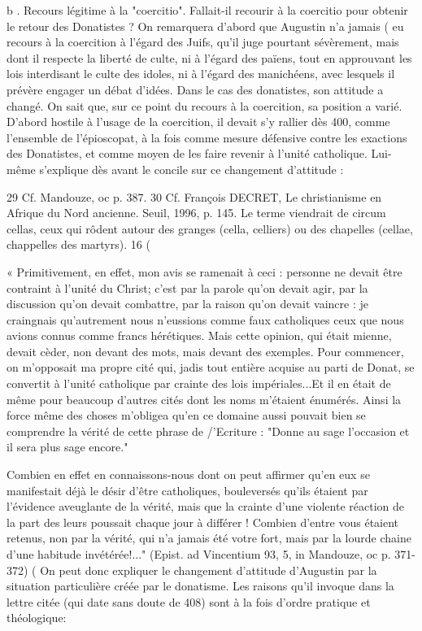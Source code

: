b . Recours légitime	à  la "coercitio".	Fallait-il recourir à la coercitio
pour obtenir le retour des Donatistes ? On remarquera d'abord que Augustin n'a jamais	(
eu recours à la coercition à l'égard des Juifs, qu'il juge pourtant sévèrement, mais
dont il respecte la liberté de culte, ni à l'égard des païens, tout en approuvant les lois interdisant le culte des idoles, ni à l'égard des manichéens, avec lesquels il prévère engager un débat d'idées. Dans le cas des donatistes, son attitude a changé. On sait que, sur ce point du recours à la coercition, sa position a varié. D'abord hostile à l'usage de la coercition, il devait s'y rallier dès 400, comme l'ensemble de l'épioscopat, à la fois comme mesure défensive contre les exactions des Donatistes, et comme moyen de les faire revenir à l'unité catholique. Lui-même s'explique dès avant le concile sur ce changement d'attitude :



29 Cf. Mandouze, oc p. 387.
30 Cf. François DECRET, Le christianisme en Afrique du Nord ancienne. Seuil, 1996, p. 145. Le terme viendrait de circum cellas, ceux qui rôdent autour des granges (cella, celliers) ou des chapelles (cellae, chappelles des martyrs).
16
(
 
« Primitivement, en effet, mon avis se ramenait à ceci : personne ne devait être contraint à l'unité du Christ; c'est par la parole qu'on devait agir, par la discussion qu'on devait combattre, par la raison qu'on devait vaincre : je craingnais qu'autrement nous n'eussions comme faux catholiques ceux que nous avions connus comme francs hérétiques. Mais cette opinion, qui était mienne, devait cèder, non devant des mots, mais devant des exemples. Pour commencer, on m'opposait ma propre cité qui, jadis tout entière acquise au parti de Donat, se convertit à l'unité
catholique par crainte des lois impériales...Et il en était de même pour beaucoup d'autres cités dont les noms m'étaient énumérés. Ainsi la force même des choses m'obligea qu'en ce domaine aussi pouvait bien se comprendre la vérité de cette phrase de /'Ecriture : "Donne au sage l'occasion et il sera plus sage encore."

Combien en effet en connaissons-nous dont on peut affirmer qu'en eux se manifestait déjà le désir d'être catholiques, bouleversés qu'ils étaient par l'évidence aveuglante de la vérité, mais que la crainte d'une violente réaction de la part des leurs poussait chaque jour à différer ! Combien d'entre vous étaient retenus, non par la
vérité, qui n'a jamais été	votre fort, mais par la lourde chaine d'une habitude invétérée!..." (Epist. ad Vincentium 93, 5, in Mandouze, oc p. 371-372)	(
On peut donc expliquer le changement d'attitude d'Augustin par la situation particulière créée par le donatisme. Les raisons qu'il invoque dans la lettre citée (qui date sans doute de 408) sont à la fois d'ordre pratique et théologique:

